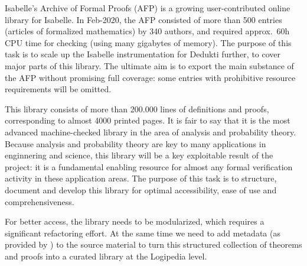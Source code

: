 \begin{workpackage}[id=libraries,type=RTD,wphases=1-48,
  short={Large libraries},%
  title={Large libraries},
  lead=Tum,
  StrRM=18,
  ChaRM=12,
  TumRM=27]
\begin{tasklist}


\begin{task}[
  id=afp,
  title=Isabelle's Archive of Formal Proofs,
  shorttitle=Isa. AFP,
  lead=Tum,
  TumRM=3,
  wphases=13-18]
  Isabelle's Archive of Formal Proofs (AFP) is a
growing user-contributed online library for Isabelle. In Feb-2020, the
AFP consisted of more than 500 entries (articles of formalized
mathematics) by 340 authors, and required approx.\ 60h CPU time for
checking (using many gigabytes of memory).  The purpose of this task
is to scale up the Isabelle instrumentation for Dedukti further, to
cover major parts of this library. The ultimate aim is to export the main
substance of the AFP without promising full coverage: some entries
with prohibitive resource requirements will be omitted.
\end{task}

\begin{task}[
  id=isaAnalysisProb,
  title=The Isabelle Analysis \& Probability Theory library,
  shorttitle=Isa. A\&P,
  lead=Tum,
  TumRM=24,
  wphases=1-24]
%
  This library consists of more than 200.000 lines
  of definitions and proofs, corresponding to almost 4000 printed
  pages. It is fair to say that it is the most advanced
  machine-checked library in the area of analysis and probability
  theory. Because analysis and probability theory are key to many
  applications in enginnering and science, this library will be a key
  exploitable result of the project: it is a fundamental enabling
  resource for almost any formal verification activity in these
  application areas. The purpose of this task is to structure,
  document and develop this library for optimal accessibility, ease of
  use and comprehensiveness.

For better access, the library needs to be modularized, which requires
a significant refactoring effort.  At the same time we need to add
metadata (as provided by ) to the source material
to turn this structured collection of theorems and proofs into a
curated library at the Logipedia level.


\end{task}
\end{tasklist}
\end{workpackage}
